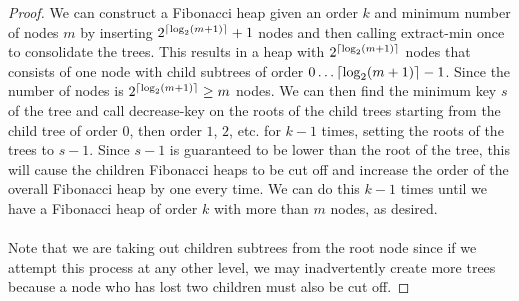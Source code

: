 \documentclass{article}
\DeclarePairedDelimiter{\ceil}{\lceil}{\rceil}
\theoremstyle{casestyle}
\begin{document}
\begin{proof}
  We can construct a Fibonacci heap given an order $k$ and minimum number of nodes $m$ by inserting $2^{\ceil{\log_2 (m+1)}}+1$ nodes and then calling extract-min once to consolidate the trees. This results in a heap with $2^{\ceil{\log_2 (m+1)}}$ nodes that consists of one node with child subtrees of order $0 \dots \ceil{\log_2 (m+1)}-1$. Since the number of nodes is $2^{\ceil{\log_2 (m+1)}} \geq m$ nodes. We can then find the minimum key $s$ of the tree and call decrease-key on the roots of the child trees starting from the child tree of order $0$, then order $1$, $2$, etc. for $k-1$ times, setting the roots of the trees to $s-1$. Since $s-1$ is guaranteed to be lower than the root of the tree, this will cause the children Fibonacci heaps to be cut off and increase the order of the overall Fibonacci heap by one every time. We can do this $k-1$ times until we have a Fibonacci heap of order $k$ with more than $m$ nodes, as desired.\\\\ Note that we are taking out children subtrees from the root node since if we attempt this process at any other level, we may inadvertently create more trees because a node who has lost two children must also be cut off.








\end{proof}
\end{document}
